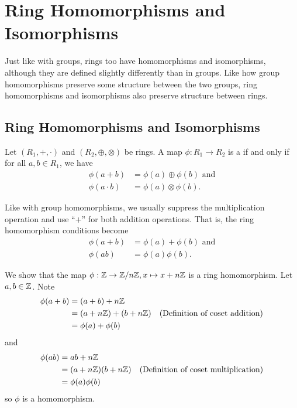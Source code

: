 \chapter{Ring Homomorphisms and Isomorphisms}
Just like with groups, rings too have homomorphisms and isomorphisms, although they are defined slightly differently than in groups. Like how group homomorphisms preserve some structure between the two groups, ring homomorphisms and isomorphisms also preserve structure between rings.

\section{Ring Homomorphisms and Isomorphisms}
\begin{definition}
    Let $(R_1, +, \cdot)$ and $(R_2, \oplus, \otimes)$ be rings. A map $\phi: R_1 \to R_2$ is a  if and only if for all $a, b \in R_1$, we have
    \begin{align*}
        \phi(a+b) &= \phi(a) \oplus \phi(b) \text{ and}\\
        \phi(a\cdot b) &= \phi(a)\otimes\phi(b).
    \end{align*}
\end{definition}
\begin{remark}
    Like with group homomorphisms, we usually suppress the multiplication operation and use ``$+$'' for both addition operations. That is, the ring homomorphism conditions become
    \begin{align*}
        \phi(a+b) &= \phi(a) + \phi(b) \text{ and}\\
        \phi(ab) &= \phi(a)\phi(b).
    \end{align*}
\end{remark}

\begin{example}
    We show that the map $\phi: \mathbb{Z} \to \mathbb{Z}/n\mathbb{Z}, x \mapsto x + n\mathbb{Z}$ is a ring homomorphism. Let $a, b \in \mathbb{Z}$. Note
    \begin{align*}
        \phi(a+b) &= (a+b) + n\mathbb{Z}\\
        &= (a + n\mathbb{Z}) + (b + n\mathbb{Z}) & (\text{Definition of coset addition})\\
        &=\phi(a)+\phi(b)
    \end{align*}
    and
    \begin{align*}
        \phi(ab) &= ab + n\mathbb{Z}\\
        &= (a + n\mathbb{Z})(b + n\mathbb{Z}) & (\text{Definition of coset multiplication})\\
        &= \phi(a)\phi(b)
    \end{align*}
    so $\phi$ is a homomorphism.
\end{example}

